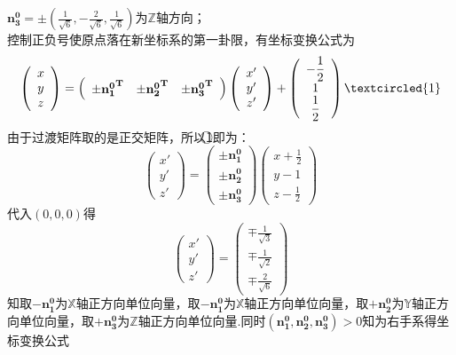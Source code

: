 \documentclass[UTF8]{ctexart}
\begin{document}
\begin{enumerate}
$\mathbf{n_3^0}=\pm\left(\displaystyle\frac{1}{\sqrt{6}},\displaystyle-\frac{2}{\sqrt{6}},\displaystyle\frac{1}{\sqrt{6}}\right)$为$\mathbb{Z}$轴方向；\\
控制正负号使原点落在新坐标系的第一卦限，有坐标变换公式为
$$\left(\begin{array}{c}x\\y\\z\end{array}\right)=\left(\begin{array}{ccc}\pm\mathbf{n_1^0}^{\mathbf{T}}&\pm\mathbf{n_2^0}^{\mathbf{T}}&\pm\mathbf{n_3^0}^{\mathbf{T}}\end{array}\right)\left(\begin{array}{c}x'\\y'\\z'\end{array}\right)+\left(\begin{array}{c}-\displaystyle\frac{1}{2}\\1\\\displaystyle\frac{1}{2}\end{array}\right)\textcircled{1}$$
由于过渡矩阵取的是正交矩阵，所以\textcircled{1}即为：
$$\left(\begin{array}{c}x'\\y'\\z'\end{array}\right)=\left(\begin{array}{c}\pm\mathbf{n_1^0}\\\pm\mathbf{n_2^0}\\\pm\mathbf{n_3^0}\end{array}\right)\left(\begin{array}{c}x+\displaystyle\frac{1}{2}\\y-1\\z-\displaystyle\frac{1}{2}\end{array}\right)$$代入$\left(0,0,0\right)$得
$$\left(\begin{array}{l}x'\\y'\\z'\end{array}\right)=\left(\begin{array}{l}\mp\displaystyle\frac{1}{\sqrt{3}}\\\mp\displaystyle\frac{1}{\sqrt{2}}\\\mp\displaystyle\frac{2}{\sqrt{6}}\end{array}\right)$$
知取$-\mathbf{n_1^0}$为$\mathbb{X}$轴正方向单位向量，取$-\mathbf{n_1^0}$为$\mathbb{X}$轴正方向单位向量，取$+\mathbf{n_2^0}$为$\mathbb{Y}$轴正方向单位向量，取$+\mathbf{n_3^0}$为$\mathbb{Z}$轴正方向单位向量.同时$\left(\mathbf{n_1^0},\mathbf{n_2^0},\mathbf{n_3^0}\right)>0$知为右手系得坐标变换公式

\end{enumerate}
\end{document}
